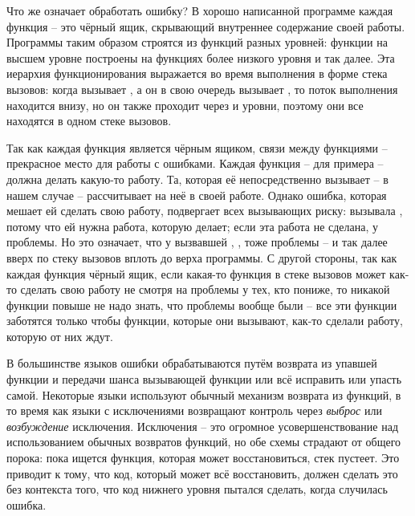 Что же означает обработать ошибку? В хорошо написанной программе каждая функция -- это
чёрный ящик, скрывающий внутреннее содержание своей работы. Программы таким образом
строятся из функций разных уровней: функции на высшем уровне построены на функциях более
низкого уровня и так далее. Эта иерархия функционирования выражается во время выполнения в
форме стека вызовов: когда  вызывает , а он в свою очередь
вызывает , то поток выполнения находится внизу, но он также проходит через
 и  уровни, поэтому они все находятся в одном стеке вызовов.

Так как каждая функция является чёрным ящиком, связи между функциями -- прекрасное место
для работы с ошибками. Каждая функция --  для примера -- должна делать
какую-то работу. Та, которая её непосредственно вызывает --  в нашем случае
-- рассчитывает на неё в своей работе. Однако ошибка, которая мешает ей сделать свою
работу, подвергает всех вызывающих риску:  вызывала , потому
что ей нужна работа, которую  делает; если эта работа не сделана, у
 проблемы. Но это означает, что у вызвавшей , ,
тоже проблемы -- и так далее вверх по стеку вызовов вплоть до верха программы. С другой
стороны, так как каждая функция чёрный ящик, если какая-то функция в стеке вызовов может
как-то сделать свою работу не смотря на проблемы у тех, кто пониже, то никакой функции
повыше не надо знать, что проблемы вообще были -- все эти функции заботятся только чтобы
функции, которые они вызывают, как-то сделали работу, которую от них ждут.

В большинстве языков ошибки обрабатываются путём возврата из упавшей функции и передачи
шанса вызывающей функции или всё исправить или упасть самой. Некоторые языки используют
обычный механизм возврата из функций, в то время как языки с исключениями возвращают
контроль через \textit{выброс} или \textit{возбуждение} исключения. Исключения -- это
огромное усовершенствование над использованием обычных возвратов функций, но обе схемы
страдают от общего порока: пока ищется функция, которая может восстановиться, стек
пустеет. Это приводит к тому, что код, который может всё восстановить, должен сделать это
без контекста того, что код нижнего уровня пытался сделать, когда случилась ошибка.

